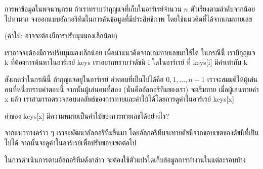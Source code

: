 \begin{quiz}{การ{\wbr}หา{\wbr}ข้อมูล{\wbr}ใน{\wbr}พจนานุกรม}
ถ้า{\wbr}เรา{\wbr}ทราบ{\wbr}ว่า{\wbr}กุญแจ{\wbr}ที่{\wbr}เก็บ{\wbr}ใน{\wbr}อาร์เรย์{\wbr}จำนวน $n$ ตัว{\wbr}เรียง{\wbr}ตาม{\wbr}ลำดับ{\wbr}จาก{\wbr}น้อย{\wbr}ไป{\wbr}หา{\wbr}มาก{\wbr}
จง{\wbr}ออกแบบ{\wbr}อัล{\wbr}กอ{\wbr}ริ{\wbr}ทึม{\wbr}ใน{\wbr}การ{\wbr}ค้น{\wbr}ข้อมูล{\wbr}ที่{\wbr}มี{\wbr}ประสิทธิภาพ โดย{\wbr}ใช้{\wbr}แนว{\wbr}คิด{\wbr}ที่{\wbr}ได้{\wbr}จาก{\wbr}เกม{\wbr}ทาย{\wbr}เลข{\wbr}

(คำ{\wbr}ใบ้: อาจ{\wbr}จะ{\wbr}ต้อง{\wbr}มี{\wbr}การ{\wbr}ปรับ{\wbr}มุมมอง{\wbr}เล็กน้อย)
\end{quiz}

เรา{\wbr}อาจ{\wbr}จะ{\wbr}ต้อง{\wbr}มี{\wbr}การ{\wbr}ปรับ{\wbr}มุมมอง{\wbr}เล็กน้อย เพื่อ{\wbr}นำ{\wbr}แนว{\wbr}คิด{\wbr}จาก{\wbr}เกม{\wbr}ทาย{\wbr}เลข{\wbr}มา{\wbr}ใช้ได้ ใน{\wbr}กรณี{\wbr}นี้{\wbr}
เรา{\wbr}มี{\wbr}กุญแจ {\ct k} ที่{\wbr}ต้องการ{\wbr}ค้นหา{\wbr}ใน{\wbr}อาร์เรย์ {\ct keys} เรา{\wbr}อยาก{\wbr}ทราบ{\wbr}ว่า{\wbr}ดัชนี {\ct
i} ใด{\wbr}ใน{\wbr}อาร์เรย์ ที่ {\ct keys[i]} มี{\wbr}ค่า{\wbr}เท่า{\wbr}กับ {\ct k}

สังเกต{\wbr}ว่า{\wbr}ใน{\wbr}กรณี{\wbr}นี้ ถ้า{\wbr}กุญแจ{\wbr}อยู่{\wbr}ใน{\wbr}อาร์เรย์ คำตอบ{\wbr}ที่{\wbr}เป็น{\wbr}ไป{\wbr}ได้{\wbr}คือ $0,1,\ldots,n-1$
เรา{\wbr}จะ{\wbr}สมมติ{\wbr}ให้{\wbr}ผู้{\wbr}เล่น{\wbr}คน{\wbr}ที่{\wbr}หนึ่ง{\wbr}ทราบ{\wbr}คำตอบ{\wbr}นี้ จากนั้น{\wbr}ผู้{\wbr}เล่น{\wbr}คน{\wbr}ที่{\wbr}สอง (นั่น{\wbr}คือ{\wbr}อัล{\wbr}กอ{\wbr}ริ{\wbr}ทึม{\wbr}ของ{\wbr}เรา)
จะ{\wbr}เริ่ม{\wbr}ทาย เมื่อ{\wbr}ผู้{\wbr}เล่น{\wbr}ทาย{\wbr}ค่า {\ct x} แล้ว{\wbr}
เรา{\wbr}สามารถ{\wbr}ตรวจสอบ{\wbr}ผลลัพธ์{\wbr}ของ{\wbr}การ{\wbr}ทาย{\wbr}และ{\wbr}คำ{\wbr}ใบ้{\wbr}ได้{\wbr}โดย{\wbr}การ{\wbr}ดู{\wbr}ค่า{\wbr}ใน{\wbr}อาร์เรย์ {\ct keys[x]}

\begin{quiz}{}
ค่า{\wbr}ของ {\ct keys[x]} มี{\wbr}ความหมาย{\wbr}เป็น{\wbr}คำ{\wbr}ใบ้{\wbr}ของ{\wbr}การ{\wbr}ทาย{\wbr}เลข{\wbr}ได้{\wbr}อย่างไร?
\end{quiz}

จาก{\wbr}แนวทาง{\wbr}คร่าว ๆ เรา{\wbr}จะ{\wbr}พัฒนา{\wbr}อัล{\wbr}กอ{\wbr}ริ{\wbr}ทึม{\wbr}ขึ้น{\wbr}มา{\wbr}
โดย{\wbr}อัล{\wbr}กอ{\wbr}ริ{\wbr}ทึม{\wbr}จะ{\wbr}ทาย{\wbr}ดัชนี{\wbr}จาก{\wbr}ขอบเขต{\wbr}ของ{\wbr}ดัชนี{\wbr}ที่{\wbr}เป็น{\wbr}ไป{\wbr}ได้{\wbr}
จากนั้น{\wbr}จะ{\wbr}ดู{\wbr}ค่า{\wbr}ใน{\wbr}อาร์เรย์{\wbr}เพื่อ{\wbr}ปรับ{\wbr}ขอบเขต{\wbr}ต่อไป{\wbr}

\begin{quiz}{}
ใน{\wbr}การ{\wbr}ดำเนินการ{\wbr}ตาม{\wbr}อัล{\wbr}กอ{\wbr}ริ{\wbr}ทึม{\wbr}ดังกล่าว จะ{\wbr}ต้อง{\wbr}ใช้{\wbr}ตัวแปร{\wbr}ใด{\wbr}เก็บ{\wbr}ข้อมูล{\wbr}การ{\wbr}ทำงาน{\wbr}ใน{\wbr}แต่ละ{\wbr}รอบ{\wbr}บ้าง{\wbr}
\end{quiz}

